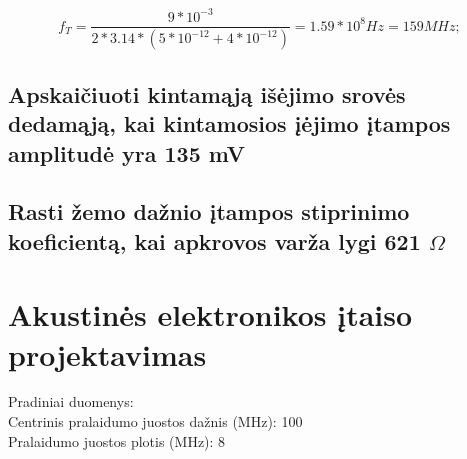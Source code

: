 \documentclass[11pt,a4paper]{article}
\begin{document}
\[
f_T = \frac{9*10^{-3}}{2*3.14*(5*10^{-12}+4*10^{-12})} = 1.59 * 10^{8} Hz = 159 MHz;
\]

\subsection{Apskaičiuoti kintamąją išėjimo srovės dedamąją, kai kintamosios įėjimo įtampos amplitudė yra 135 mV}
\subsection{Rasti žemo dažnio įtampos stiprinimo koeficientą, kai apkrovos varža lygi 621 $\Omega$}

\section{Akustinės elektronikos įtaiso projektavimas}
Pradiniai duomenys:\\
Centrinis pralaidumo juostos dažnis (MHz): 100\\
Pralaidumo juostos plotis (MHz): 8
\end{document}
